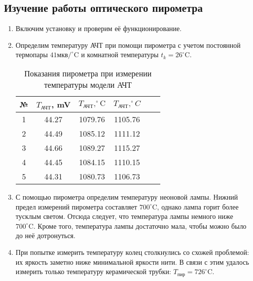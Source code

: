 \documentclass[a4paper, 12pt]{article}
\begin{document}
    \subsection{Изучение работы оптического пирометра}
    \begin{enumerate}
    	\item Включим установку и проверим её функционирование.
    	\item Определим температуру АЧТ при помощи пирометра с учетом постоянной термопары $41\text{мкв}/^\circ \text{C}$ и комнатной температуры $t_k=26^\circ\text{C}$.
    	\begin{table}[h]
    		\label{table1}
    		\centering
    		\begin{tabular}{|c|c|c|c|c|c|}
    			\hline
    			№ & $T_{\text{АЧТ}}$, mV & $T_{\text{АЧТ}}, ^\circ \text{C}$ & $T_{\text{АЧТ}},^\circ C$\\
    			\hline
    			1 & 44.27 & 1079.76 & 1105.76\\
    			2 & 44.49 & 1085.12 & 1111.12\\
    			3 & 44.66 & 1089.27 & 1115.27\\
    			4 & 44.45 & 1084.15 & 1110.15\\
    			5 & 44.31 & 1080.73 & 1106.73\\
    			\hline
    		\end{tabular}
    		\caption{Показания пирометра при измерении температуры модели АЧТ}
    	\end{table}
    	\item С помощью пирометра определим температуру неоновой лампы. Нижний предел измерений пирометра составляет $700^\circ\text{C}$, однако лампа горит более тусклым светом. Отсюда следует, что температура лампы немного ниже $700^\circ\text{C}$. Кроме того, температура лампы достаточно мала, чтобы можно было до неё дотронуться.
    	\item При попытке измерить температуру колец столкнулись со схожей проблемой: их яркость заметно ниже минимальной яркости нити. В связи с этим удалось измерить только температуру керамической трубки: $T_{\text{пир}}=726^\circ\text{C}$.
    \end{enumerate}
\end{document}
